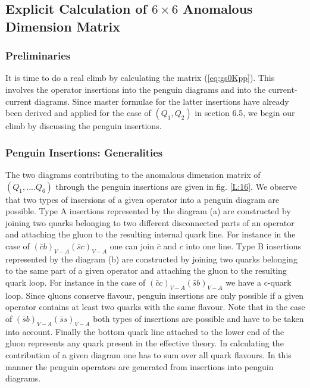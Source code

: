 \documentclass[12pt]{article}
\begin{document}
\begin{itemize}
\begin{itemize}
\subsection{Explicit Calculation of $6\times 6$ Anomalous Dimension
            Matrix}
\subsubsection{Preliminaries}
It is time to do a real climb by calculating the 
matrix (\ref{eq:gs0Kpp}). This involves the operator insertions
into the penguin diagrams and into the current-current diagrams. Since
master formulae for the latter insertions have already been derived
and applied for the case of $(Q_1,Q_2)$ in section 6.5, we begin our
climb
by discussing the penguin insertions.
\subsubsection{Penguin Insertions: Generalities}
The two diagrams contributing to the anomalous dimension matrix of
$(Q_1,....Q_6)$ through the penguin insertions are given in fig.
\ref{L:16}.
We observe that two types of insersions of a given operator into
a penguin diagram are possible. Type A insertions represented by the
diagram (a) are constructed by joining two quarks belonging to 
two different disconnected parts of an operator 
and attaching the gluon to the resulting internal quark line.
For instance in the case of $(\bar c b)_{V-A}(\bar s c)_{V-A}$
one can join $\bar c$ and $c$ into one line. Type B insertions
represented by the diagram (b) are constructed by joining two quarks
belonging to the same part of a given operator and attaching the
gluon to the resulting quark loop. For instance in the case of
$(\bar c c)_{V-A}(\bar s b)_{V-A}$ we have a c-quark loop. Since
qluons conserve flavour, penguin insertions are only possible
 if a given operator contains at least two quarks with the same
flavour. Note that in the case of $(\bar sb)_{V-A}(\bar s s)_{V-A}$
both types of insertions are possible and have to be taken into
account. Finally the bottom quark line attached to the lower end
of the gluon represents any quark present in the effective theory.
In calculating the contribution of a given diagram one has to sum
over all quark flavours. In this manner the penguin operators
are generated from insertions into penguin diagrams.
\begin{figure}[hbt]
\vspace{0.10in}
\centerline{
\epsfysize=1.5in
}
\end{figure}
\end{itemize}
\end{itemize}
\end{document}
